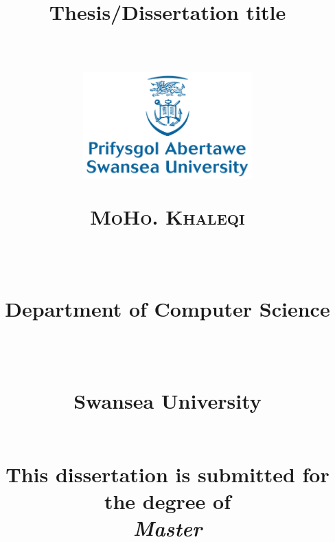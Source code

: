 
\newcommand{\horrule}[1]{\rule{\linewidth}{#1}} %
\title{
\begin{Huge}\textbf{Thesis/Dissertation title} \end{Huge} \\%
\vspace{70px}
\includegraphics[width = 65mm]{Figs/SwanseaUniversity}\\[8ex]
\begin{large} \textsc{\textbf{MoHo. Khaleqi}} \end{large} \\ %
\vspace{10px}
\normalfont \normalsize 
\begin{normalsize}Department of Computer Science \end{normalsize}\\  %
\begin{normalsize} Swansea University \end{normalsize} \\ %
\vspace{60px}
This dissertation is submitted for the degree of\\
\textit{Master}
\vspace{20px}
}
\author{} %
\date{} %

